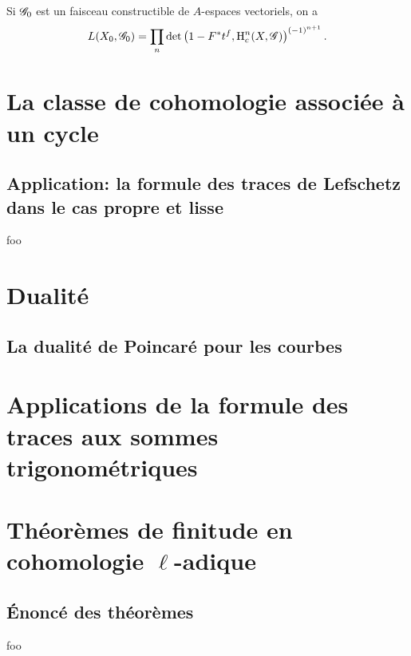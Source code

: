 \documentclass[oneside]{book}
\begin{document}
Si $\mathscr{G}_0$ est un faisceau constructible de $A$-espaces vectoriels, on a 
\[
  L(X_0,\mathscr{G}_0) = \prod_n \det\left(1-F^* t^f,\operatorname{H}_c^n(X,\mathscr{G})\right)^{(-1)^{n+1}} \text{.}
\]










\chapter{La classe de cohomologie associée à un cycle}\label{IV}

\section{Application: la formule des traces de Lefschetz dans le cas propre et lisse}\label{IV:3}

\begin{corollary_}\label{IV:3-7}
foo
\end{corollary_}

\chapter{Dualité}\label{V}

\section{La dualité de Poincaré pour les courbes}\label{V:2}

\chapter{Applications de la formule des traces aux sommes trigonométriques}\label{VI}

\chapter{Théorèmes de finitude en cohomologie \texorpdfstring{$\ell$}{l}-adique}\label{VII}

\section{Énoncé des théorèmes}\label{VII:1}

\begin{theorem_}\label{VII:1-1}
foo
\end{theorem_}












\end{document}
